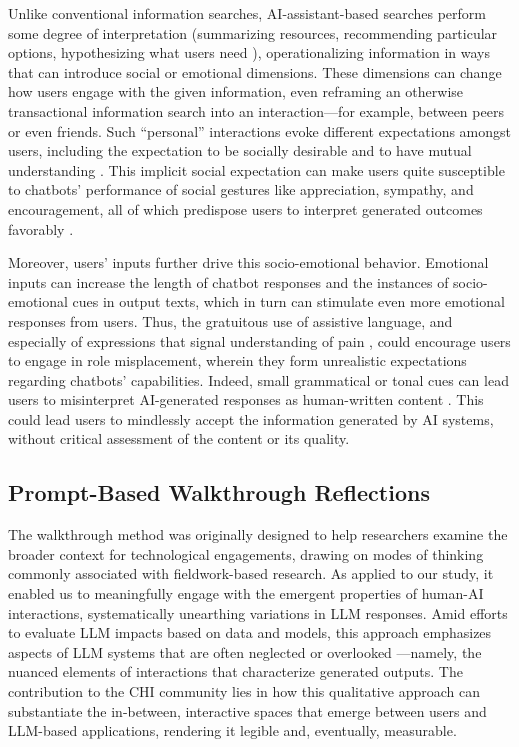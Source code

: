 Unlike conventional information searches, AI-assistant-based searches perform some degree of interpretation (summarizing resources, recommending particular options, hypothesizing what users need \citep{azzopardi2024conceptual, radlinski2017theoretical}), operationalizing information in ways that can introduce social or emotional dimensions. These dimensions can change how users engage with the given information, even reframing an otherwise transactional information search into an interaction---for example, between peers or even friends. Such ``personal'' interactions evoke different expectations amongst users, including the expectation to be socially desirable and to have mutual understanding \citep{clark2019makes}. This implicit social expectation can make users quite susceptible to chatbots' performance of social gestures like appreciation, sympathy, and encouragement, all of which predispose users to interpret generated outcomes favorably \citep{norman2008way}. 

Moreover, users' inputs further drive this socio-emotional behavior. Emotional inputs can increase the length of chatbot responses and the instances of socio-emotional cues in output texts, which in turn can stimulate even more emotional responses from users. Thus, the gratuitous use of assistive language, and especially of expressions that signal understanding of pain \citep{urquiza2015mind}, could encourage users to engage in role misplacement, wherein they form unrealistic expectations regarding chatbots' capabilities. Indeed, small grammatical or tonal cues can lead users to misinterpret AI-generated responses as human-written content \citep{jakesch2023human}. This could lead users to mindlessly accept the information generated by AI systems, without critical assessment of the content or its quality. 


\subsection{Prompt-Based Walkthrough Reflections}
The walkthrough method was originally designed to help researchers examine the broader context for technological engagements, drawing on modes of thinking commonly associated with fieldwork-based research. As applied to our study, it enabled us to meaningfully engage with the emergent properties of human-AI interactions, systematically unearthing variations in LLM responses. 
Amid efforts to evaluate LLM impacts based on data and models, this approach emphasizes aspects of LLM systems that are often neglected or overlooked \citep{light2018walkthrough}---namely, the nuanced elements of interactions that characterize generated outputs. The contribution to the CHI community lies in how this qualitative approach can substantiate the in-between, interactive spaces that emerge between users and LLM-based applications, rendering it legible and, eventually, measurable.

